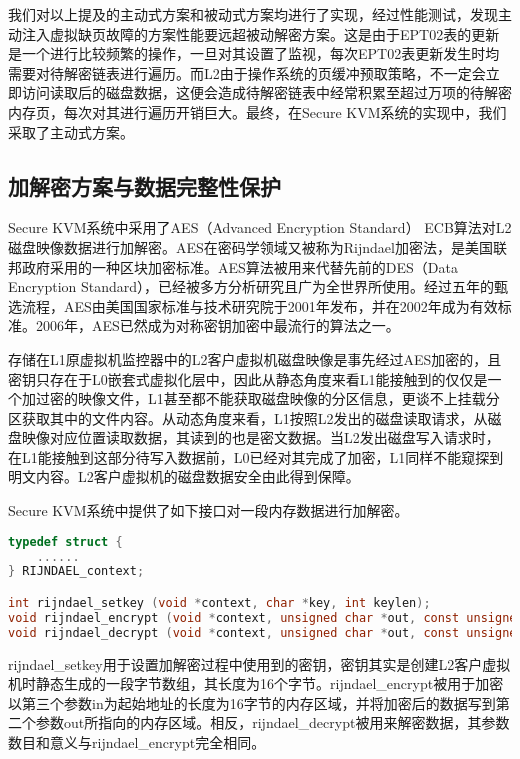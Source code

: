 我们对以上提及的主动式方案和被动式方案均进行了实现，经过性能测试，发现主动注入虚拟缺页故障的方案性能要远超被动解密方案。这是由于EPT02表的更新是一个进行比较频繁的操作，一旦对其设置了监视，每次EPT02表更新发生时均需要对待解密链表进行遍历。而L2由于操作系统的页缓冲预取策略，不一定会立即访问读取后的磁盘数据，这便会造成待解密链表中经常积累至超过万项的待解密内存页，每次对其进行遍历开销巨大。最终，在Secure KVM系统的实现中，我们采取了主动式方案。

\subsection{加解密方案与数据完整性保护}

Secure KVM系统中采用了AES（Advanced Encryption Standard） ECB算法对L2磁盘映像数据进行加解密\cite{daemen2002design}。AES在密码学领域又被称为Rijndael加密法，是美国联邦政府采用的一种区块加密标准。AES算法被用来代替先前的DES（Data Encryption Standard）\cite{biham1993differential}，已经被多方分析研究且广为全世界所使用。经过五年的甄选流程，AES由美国国家标准与技术研究院于2001年发布，并在2002年成为有效标准。2006年，AES已然成为对称密钥加密中最流行的算法之一。

存储在L1原虚拟机监控器中的L2客户虚拟机磁盘映像是事先经过AES加密的，且密钥只存在于L0嵌套式虚拟化层中，因此从静态角度来看L1能接触到的仅仅是一个加过密的映像文件，L1甚至都不能获取磁盘映像的分区信息，更谈不上挂载分区获取其中的文件内容。从动态角度来看，L1按照L2发出的磁盘读取请求，从磁盘映像对应位置读取数据，其读到的也是密文数据。当L2发出磁盘写入请求时，在L1能接触到这部分待写入数据前，L0已经对其完成了加密，L1同样不能窥探到明文内容。L2客户虚拟机的磁盘数据安全由此得到保障。

Secure KVM系统中提供了如下接口对一段内存数据进行加解密。

\begin{lstlisting}[language={C}, caption={inject\_virtual\_ept\_fault函数实现源码}]
typedef struct {
    ......
} RIJNDAEL_context;

int rijndael_setkey (void *context, char *key, int keylen);
void rijndael_encrypt (void *context, unsigned char *out, const unsigned char *in);
void rijndael_decrypt (void *context, unsigned char *out, const unsigned char *in);
\end{lstlisting}

rijndael\_setkey用于设置加解密过程中使用到的密钥，密钥其实是创建L2客户虚拟机时静态生成的一段字节数组，其长度为16个字节。rijndael\_encrypt被用于加密以第三个参数in为起始地址的长度为16字节的内存区域，并将加密后的数据写到第二个参数out所指向的内存区域。相反，rijndael\_decrypt被用来解密数据，其参数数目和意义与rijndael\_encrypt完全相同。

